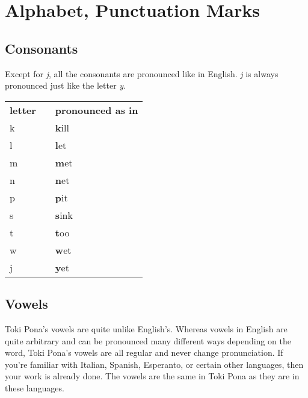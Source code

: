 \label{'pronunciation_alphabet'}
\section{Alphabet, Punctuation Marks}
%
\subsection*{Consonants}
%
Except for \textit{j}, all the consonants are pronounced like in English. 
\textit{j} is always pronounced just like the letter \textit{y}. 

\begin{supertabular}{p{2cm}|ll}
\textbf{letter}   &&    \textbf{pronounced as in} \\ %
k && \textbf{k}ill  \\ %
l && \textbf{l}et   \\ %
m && \textbf{m}et   \\ %
n && \textbf{n}et   \\ %
p && \textbf{p}it   \\ %
s && \textbf{s}ink  \\ %
t && \textbf{t}oo   \\ %
w && \textbf{w}et   \\ %
j && \textbf{y}et   \\ %
\end{supertabular} 

\subsection*{Vowels}
%
Toki Pona's vowels are quite unlike English's. Whereas vowels in English are quite arbitrary and can be pronounced many different ways depending on the word, Toki Pona's vowels are all regular and never change pronunciation. 
If you're familiar with Italian, Spanish, Esperanto, or certain other languages, then your work is already done. The vowels are the same in Toki Pona as they are in these languages. 

